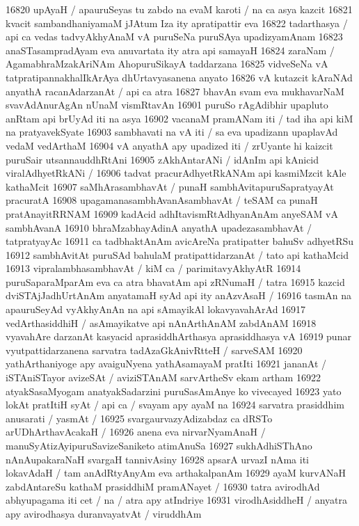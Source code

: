 16820 upAyaH / apauruSeyas tu zabdo na evaM karoti / na ca asya kazcit
16821 kvacit sambandhaniyamaM jJAtum Iza ity apratipattir eva 
16822 tadarthasya / api ca vedas tadvyAkhyAnaM vA puruSeNa puruSAya upadizyamAnam
16823 anaSTasampradAyam eva anuvartata ity atra api samayaH 
16824 zaraNam / AgamabhraMzakAriNAm AhopuruSikayA taddarzana  
16825 vidveSeNa vA tatpratipannakhalIkArAya dhUrtavyasanena anyato
16826 vA kutazcit kAraNAd anyathA racanAdarzanAt / api ca atra  
16827 bhavAn svam eva mukhavarNaM svavAdAnurAgAn nUnaM vismRtavAn
16901 puruSo rAgAdibhir upapluto anRtam api brUyAd iti na asya
16902 vacanaM pramANam iti / tad iha api kiM na pratyavekSyate  
16903 sambhavati na vA iti / sa eva upadizann upaplavAd vedaM vedArthaM  
16904 vA anyathA apy upadized iti / zrUyante hi kaizcit puruSair utsannauddhRtAni
16905 zAkhAntarANi / idAnIm api kAnicid viralAdhyetRkANi /  
16906 tadvat pracurAdhyetRkANAm api kasmiMzcit kAle kathaMcit  
16907 saMhArasambhavAt / punaH sambhAvitapuruSapratyayAt pracuratA  
16908 upagamanasambhAvanAsambhavAt / teSAM ca punaH pratAnayitRRNAM
16909 kadAcid adhItavismRtAdhyanAnAm anyeSAM vA sambhAvanA  
16910 bhraMzabhayAdinA anyathA upadezasambhavAt / tatpratyayAc 
16911 ca tadbhaktAnAm avicAreNa pratipatter bahuSv adhyetRSu 
16912 sambhAvitAt puruSAd bahulaM pratipattidarzanAt / tato api kathaMcid  
16913 vipralambhasambhavAt / kiM ca / parimitavyAkhyAtR 
16914 puruSaparaMparAm eva ca atra bhavatAm api zRNumaH / tatra  
16915 kazcid dviSTAjJadhUrtAnAm anyatamaH syAd api ity anAzvAsaH / 
16916 tasmAn na apauruSeyAd vyAkhyAnAn na api sAmayikAl lokavyavahArAd
16917 vedArthasiddhiH / asAmayikatve api nAnArthAnAM zabdAnAM 
16918 vyavahAre darzanAt kasyacid aprasiddhArthasya aprasiddhasya vA 
16919 punar vyutpattidarzanena sarvatra tadAzaGkAnivRtteH / sarveSAM  
16920 yathArthaniyoge apy avaiguNyena yathAsamayaM pratIti 
16921 jananAt / iSTAniSTayor avizeSAt / aviziSTAnAM sarvArtheSv ekam artham
16922 atyakSasaMyogam anatyakSadarzini puruSasAmAnye ko vivecayed 
16923 yato lokAt pratItiH syAt / api ca / svayam apy ayaM na  
16924 sarvatra prasiddhim anusarati / yasmAt /
16925 	svargaurvazyAdizabdaz ca dRSTo arUDhArthavAcakaH / 
16926 anena eva nirvarNyamAnaH / manuSyAtizAyipuruSavizeSaniketo atimAnuSa
16927 sukhAdhiSThAno nAnAupakaraNaH svargaH tannivAsiny  
16928 apsarA urvazI nAma iti lokavAdaH / tam anAdRtyAnyAm eva arthakalpanAm
16929 ayaM kurvANaH zabdAntareSu kathaM prasiddhiM pramANayet / 
16930 tatra avirodhAd abhyupagama iti cet / na / atra apy atIndriye  
16931 virodhAsiddheH / anyatra apy avirodhasya duranvayatvAt / viruddhAm 
